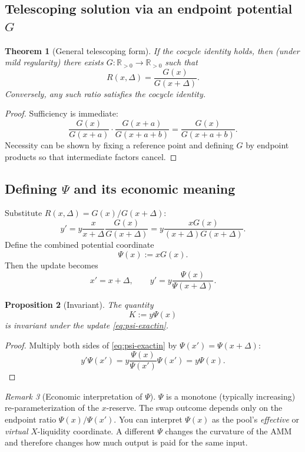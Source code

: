 \documentclass[11pt]{article}
\newtheorem{theorem}{Theorem}[section]
\newtheorem{proposition}[theorem]{Proposition}
\theoremstyle{definition}
\theoremstyle{remark}
\newtheorem{remark}[theorem]{Remark}
\newcommand{\R}{\mathbb{R}}
\newcommand{\Rp}{\R_{>0}}
\begin{document}
\subsection{Telescoping solution via an endpoint potential $G$}

\begin{theorem}[General telescoping form]
If the cocycle identity holds, then (under mild regularity) there exists $G:\Rp\to\Rp$ such that
\[
\boxed{R(x,\Delta)=\frac{G(x)}{G(x+\Delta)}}.
\]
Conversely, any such ratio satisfies the cocycle identity.
\end{theorem}

\begin{proof}
Sufficiency is immediate:
\[
\frac{G(x)}{G(x+a)}\cdot\frac{G(x+a)}{G(x+a+b)}=\frac{G(x)}{G(x+a+b)}.
\]
Necessity can be shown by fixing a reference point and defining $G$ by endpoint products so that intermediate factors cancel.
\end{proof}

\subsection{Defining $\Psi$ and its economic meaning}

Substitute $R(x,\Delta)=G(x)/G(x+\Delta)$:
\[
 y' = y\frac{x}{x+\Delta}\frac{G(x)}{G(x+\Delta)} = y\frac{xG(x)}{(x+\Delta)G(x+\Delta)}.
\]
Define the combined potential coordinate
\[
\boxed{\Psi(x):=xG(x)}.
\]
Then the update becomes
\begin{equation}
\boxed{\;x'=x+\Delta,\qquad y'=y\frac{\Psi(x)}{\Psi(x+\Delta)}.\;}
\label{eq:psi-exactin}
\end{equation}

\begin{proposition}[Invariant]
The quantity
\[
\boxed{K:=y\Psi(x)}
\]
is invariant under the update \eqref{eq:psi-exactin}.
\end{proposition}

\begin{proof}
Multiply both sides of \eqref{eq:psi-exactin} by $\Psi(x')=\Psi(x+\Delta)$:
\[
 y'\Psi(x') = y\frac{\Psi(x)}{\Psi(x')}\Psi(x') = y\Psi(x).
\]
\end{proof}

\begin{remark}[Economic interpretation of $\Psi$]
$\Psi$ is a monotone (typically increasing) re-parameterization of the $x$-reserve.
The swap outcome depends only on the endpoint ratio $\Psi(x)/\Psi(x')$.
You can interpret $\Psi(x)$ as the pool's \emph{effective} or \emph{virtual} $X$-liquidity coordinate.
A different $\Psi$ changes the curvature of the AMM and therefore changes how much output is paid for the same input.
\end{remark}
\end{document}
